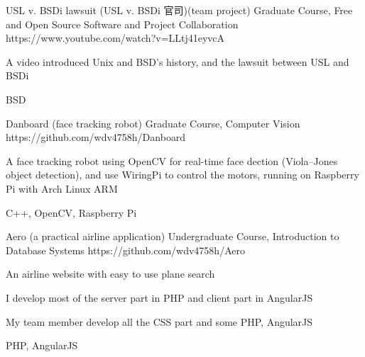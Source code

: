 
\begin{cvopensources}


  \cvopensource
    {USL v. BSDi lawsuit (USL v. BSDi 官司)(team project)}
    {Graduate Course, Free and Open Source Software and Project Collaboration}
    {https://www.youtube.com/watch?v=LLtj41eyvcA}
    {
      \begin{cvitems}
        \item {A video introduced Unix and BSD's history, and the lawsuit between USL and BSDi}
      \end{cvitems}
    }
    {BSD}

  \cvopensource
    {Danboard (face tracking robot)}
    {Graduate Course, Computer Vision}
    {https://github.com/wdv4758h/Danboard}
    {
      \begin{cvitems}
        \item {A face tracking robot using OpenCV for real-time face dection (Viola–Jones object detection), and use WiringPi to control the motors, running on Raspberry Pi with Arch Linux ARM}
      \end{cvitems}
    }
    {C++, OpenCV, Raspberry Pi}

  \cvopensource
    {Aero (a practical airline application)}
    {Undergraduate Course, Introduction to Database Systems}
    {https://github.com/wdv4758h/Aero}
    {
      \begin{cvitems}
        \item {An airline website with easy to use plane search}
        \item {I develop most of the server part in PHP and client part in AngularJS}
        \item {My team member develop all the CSS part and some PHP, AngularJS}
      \end{cvitems}
    }
    {PHP, AngularJS}


\end{cvopensources}
